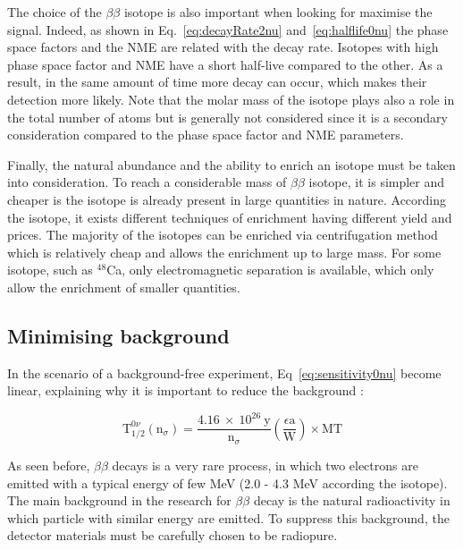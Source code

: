 \documentclass[main.tex]{subfiles}
\begin{document}
\NI The choice of the $\beta\beta$ isotope is also important when looking for maximise the signal. Indeed, as shown in Eq.~\ref{eq:decayRate2nu} and~\ref{eq:halflife0nu} the phase space factors and the NME are related with the decay rate. Isotopes with high phase space factor and NME have a short half-live compared to the other. As a result, in the same amount of time more decay can occur, which makes their detection more likely. Note that the molar mass of the isotope plays also a role in the total number of atoms but is generally not considered since it is a secondary consideration compared to the phase space factor and NME parameters.


\bigskip


\NI Finally, the natural abundance and the ability to enrich an isotope must be taken into consideration. To reach a considerable mass of $\beta\beta$ isotope, it is simpler and cheaper is the isotope is already present in large quantities in nature. According the isotope, it exists different techniques of enrichment having different yield and prices. The majority of the isotopes can be enriched via centrifugation method which is relatively cheap and allows the enrichment up to large mass. For some isotope, such as $^{48}$Ca, only electromagnetic separation is available, which only allow the enrichment of smaller quantities.


\subsection{Minimising background}


\NI In the scenario of a background-free experiment, Eq~\ref{eq:sensitivity0nu} become linear, explaining why it is important to reduce the background :


\begin{equation}
\text{T}_{\text{1/2}}^{0\nu} (\text{n}_\sigma) = \frac{\text{4.16}~\times~\text{10}^{\text{26}}~\text{y}}{\text{n}_\sigma} \left(\frac{\epsilon \text{a}}{\text{W}} \right) \times \text{MT}
\end{equation}


\NI As seen before, $\beta\beta$ decays is a very rare process, in which two electrons are emitted with a typical energy of few MeV (2.0 - 4.3 MeV according the isotope). The main background in the research for $\beta\beta$ decay is the natural radioactivity in which particle with similar energy are emitted. To suppress this background, the detector materials must be carefully chosen to be radiopure.
\end{document}
